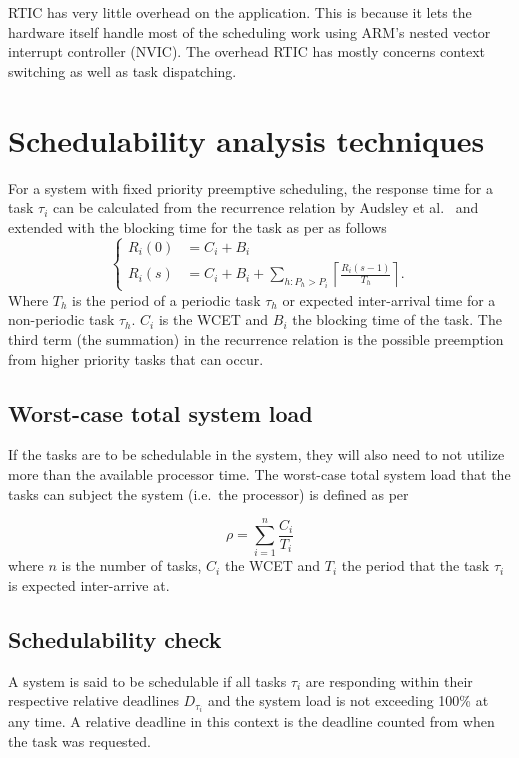 RTIC has very little overhead on the application. This is because it lets the
hardware itself handle most of the scheduling work using ARM's nested vector
interrupt controller (NVIC).  The overhead RTIC has mostly concerns context switching
as well as task dispatching.

\section{Schedulability analysis techniques}
\label{theory:schedulability}
For a system with fixed priority preemptive scheduling, the response time for
a task $\tau_i$ can be calculated from the recurrence relation by Audsley et
al.\ \cite{audsley93} and extended with the blocking time for the
task as per\cite{hardrealtimecomputingsystems} as follows
\begin{equation}
    \begin{cases}
        R_{i}(0) &= C_i + B_i \\
        R_{i}(s) &= C_i + B_i + \sum\limits_{h: P_h > P_i} \left\lceil \frac{R_{i}(s-1)}{T_h} \right\rceil.
    \end{cases}
\end{equation}
Where $T_h$ is the period of a periodic task $\tau_h$ or expected inter-arrival
time for a non-periodic task $\tau_h$. $C_i$ is the WCET and $B_i$ the blocking
time of the task. The third term (the summation) in the recurrence relation is
the possible preemption from higher priority tasks that can occur.

\subsection{Worst-case total system load}
If the tasks are to be schedulable in the system, they will also need to not
utilize more than the available processor time. The worst-case total system
load that the tasks can subject the system (i.e.\ the processor) is defined
as per \cite{hardrealtimecomputingsystems}

\begin{equation}
    \rho = \sum^{n}_{i=1} \frac{C_i}{T_i}
\end{equation}
where $n$ is the number of tasks, $C_i$ the WCET and $T_i$ the
period that the task $\tau_i$ is expected inter-arrive at.

\subsection{Schedulability check}
A system is said to be schedulable if all tasks $\tau_i$ are responding within
their respective relative deadlines $D_{\tau_i}$ and the system load is not exceeding
100\% at any time. A relative deadline in this context is the deadline counted
from when the task was requested.

